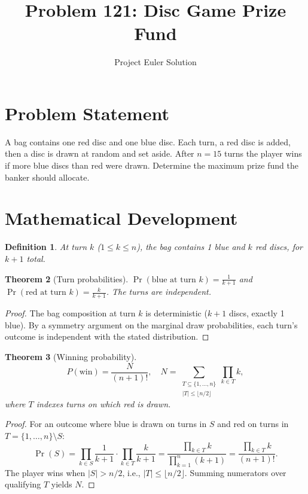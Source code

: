 \documentclass[11pt,a4paper]{article}
\title{Problem 121: Disc Game Prize Fund}
\author{Project Euler Solution}
\date{}
\newtheorem{theorem}{Theorem}
\newtheorem{definition}[theorem]{Definition}
\begin{document}
\maketitle

\section{Problem Statement}

A bag contains one red disc and one blue disc. Each turn, a red disc is added, then a disc is drawn at random and set aside. After $n = 15$ turns the player wins if more blue discs than red were drawn. Determine the maximum prize fund the banker should allocate.

\section{Mathematical Development}

\begin{definition}
At turn $k$ ($1 \le k \le n$), the bag contains 1 blue and $k$ red discs, for $k + 1$ total.
\end{definition}

\begin{theorem}[Turn probabilities]
$\Pr(\text{blue at turn } k) = \frac{1}{k+1}$ and $\Pr(\text{red at turn } k) = \frac{k}{k+1}$. The turns are independent.
\end{theorem}

\begin{proof}
The bag composition at turn $k$ is deterministic ($k + 1$ discs, exactly 1 blue). By a symmetry argument on the marginal draw probabilities, each turn's outcome is independent with the stated distribution.
\end{proof}

\begin{theorem}[Winning probability]
\[
P(\text{win}) = \frac{N}{(n+1)!}, \quad N = \sum_{\substack{T \subseteq \{1,\ldots,n\} \\ |T| \le \lfloor n/2 \rfloor}} \prod_{k \in T} k,
\]
where $T$ indexes turns on which red is drawn.
\end{theorem}

\begin{proof}
For an outcome where blue is drawn on turns in $S$ and red on turns in $T = \{1,\ldots,n\} \setminus S$:
\[
\Pr(S) = \prod_{k \in S} \frac{1}{k+1} \cdot \prod_{k \in T} \frac{k}{k+1} = \frac{\prod_{k \in T} k}{\prod_{k=1}^{n}(k+1)} = \frac{\prod_{k \in T} k}{(n+1)!}.
\]
The player wins when $|S| > n/2$, i.e., $|T| \le \lfloor n/2 \rfloor$. Summing numerators over qualifying $T$ yields $N$.
\end{proof}
\end{document}
